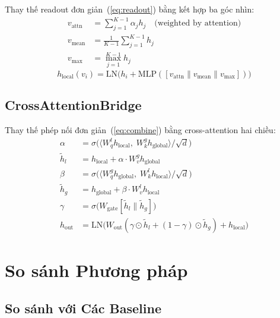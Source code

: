 \documentclass[12pt,a4paper]{article}
\begin{document}
Thay thế readout đơn giản~(\ref{eq:readout}) bằng kết hợp ba góc nhìn:
\begin{align}
  v_\text{attn} &= \sum_{j=1}^{K-1} \alpha_j h_j \quad \text{(weighted by attention)} \\
  v_\text{mean} &= \frac{1}{K-1}\sum_{j=1}^{K-1} h_j \\
  v_\text{max}  &= \max_{j=1}^{K-1} h_j
\end{align}
\begin{equation}
  h_\text{local}(v_i) = \text{LN}\bigl(h_i + \text{MLP}([v_\text{attn} \| v_\text{mean} \| v_\text{max}])\bigr)
\end{equation}

\subsection{CrossAttentionBridge}

Thay thế phép nối đơn giản~(\ref{eq:combine}) bằng cross-attention hai chiều:
\begin{align}
  \alpha &= \sigma\bigl(\langle W_q^l h_\text{local},\; W_k^g h_\text{global}\rangle / \sqrt{d}\bigr)\\
  \tilde{h}_l &= h_\text{local} + \alpha \cdot W_v^g h_\text{global}\\
  \beta &= \sigma\bigl(\langle W_q^g h_\text{global},\; W_k^l h_\text{local}\rangle / \sqrt{d}\bigr)\\
  \tilde{h}_g &= h_\text{global} + \beta \cdot W_v^l h_\text{local}\\
  \gamma &= \sigma\bigl(W_\text{gate}[\tilde{h}_l \| \tilde{h}_g]\bigr)\\
  h_\text{out} &= \text{LN}\bigl(W_\text{out}(\gamma \odot \tilde{h}_l + (1-\gamma) \odot \tilde{h}_g) + h_\text{local}\bigr)
\end{align}

\section{So sánh Phương pháp}

\subsection{So sánh với Các Baseline}
\end{document}

